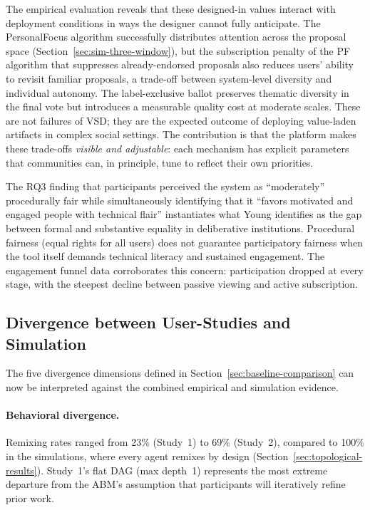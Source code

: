 \documentclass[a4paper, 12pt, twoside]{iviathesis}
\begin{document}
The empirical evaluation reveals that these designed-in values interact with deployment conditions in ways the designer cannot fully anticipate. The PersonalFocus algorithm successfully distributes attention across the proposal space (Section~\ref{sec:sim-three-window}), but the subscription penalty of the PF algorithm that suppresses already-endorsed proposals also reduces users' ability to revisit familiar proposals, a trade-off between system-level diversity and individual autonomy. The label-exclusive ballot preserves thematic diversity in the final vote but introduces a measurable quality cost at moderate scales. These are not failures of VSD; they are the expected outcome of deploying value-laden artifacts in complex social settings. The contribution is that the platform makes these trade-offs \textit{visible and adjustable}: each mechanism has explicit parameters that communities can, in principle, tune to reflect their own priorities.

The RQ3 finding that participants perceived the system as ``moderately'' procedurally fair while simultaneously identifying that it ``favors motivated and engaged people with technical flair'' instantiates what Young \cite{young2000} identifies as the gap between formal and substantive equality in deliberative institutions. Procedural fairness (equal rights for all users) does not guarantee participatory fairness when the tool itself demands technical literacy and sustained engagement. The engagement funnel data corroborates this concern: participation dropped at every stage, with the steepest decline between passive viewing and active subscription.


\subsection{Divergence between User-Studies and Simulation}
\label{sec:human-divergence}

The five divergence dimensions defined in Section~\ref{sec:baseline-comparison} can now be interpreted against the combined empirical and simulation evidence.

\paragraph{Behavioral divergence.}
Remixing rates ranged from 23\% (Study~1) to 69\% (Study~2), compared to 100\% in the simulations, where every agent remixes by design (Section~\ref{sec:topological-results}). Study~1's flat DAG (max depth~1) represents the most extreme departure from the ABM's assumption that participants will iteratively refine prior work.
\end{document}
